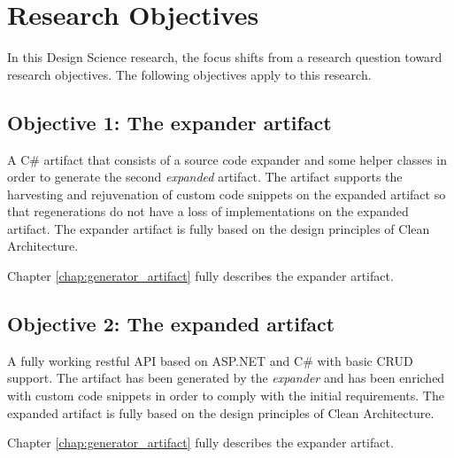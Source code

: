 \section{Research Objectives} \label{sec:research_objectives}

In this Design Science research, the focus shifts from a research question toward
research objectives. The following objectives apply to this research.

\subsection*{Objective 1: The expander artifact}
A C\# artifact that consists of a source code expander and some helper classes in order to
generate the second \emph{expanded} artifact. The artifact supports the harvesting and
rejuvenation of custom code snippets on the expanded artifact so that regenerations do not
have a loss of implementations on the expanded artifact. The expander artifact is fully
based on the design principles of Clean Architecture.

Chapter \ref{chap:generator_artifact} fully describes the expander artifact.

\subsection*{Objective 2: The expanded artifact}
A fully working restful API based on ASP.NET and C\# with basic CRUD support. The artifact
has been generated by the \emph{expander} and has been enriched with custom code snippets
in order to comply with the initial requirements. The expanded artifact is fully based on
the design principles of Clean Architecture.

Chapter \ref{chap:generator_artifact} fully describes the expander artifact.

